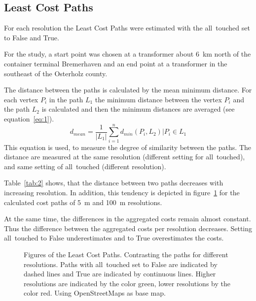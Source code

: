 \subsection{Least Cost Paths}\label{subsec:least-cost-paths}
For each resolution the Least Cost Paths were estimated with the all~touched set to False and True.

For the study, a start point was chosen at a transformer about 6~km north of the container terminal Bremerhaven and an end point at a transformer in the southeast of the Osterholz county. 

The distance between the paths is calculated by the mean minimum distance.
For each vertex $P_i$ in the path $L_1$ the minimum distance between the vertex $P_i$ and the path $L_2$
is calculated and then the minimum distances are averaged (see equation~\ref{eq:1}).
\begin{equation}
	\label{eq:1}
	d_{mean} = \frac{1}{|L_1|} \sum_{i=1}^{n} d_{min}(P_i, L_2) \Bigr\vert P_i \in L_1
\end{equation}
This equation is used, to measure the degree of similarity between the paths.
The distance are measured at the same resolution (different setting for all~touched), and same setting of all~touched (different resolution).

Table~\ref{tab:2} shows, that the distance between two paths decreases
with increasing resolution.
In addition, this tendency is depicted in figure~\ref{fig:paths_resolution} for the calculated cost paths of 5~m and 100~m resolutions.


At the same time, the differences in the aggregated costs remain almost constant.
Thus the difference between the aggregated costs per resolution decreases.
Setting all~touched to False underestimates and to True overestimates the costs.

\begin{figure}
	\centering

	\qquad
	\caption{Figures of the Least Cost Paths. Contrasting the paths for different resolutions. Paths with all~touched set to False are indicated by dashed lines and True are indicated by continuous lines. Higher resolutions are indicated by the color green, lower resolutions by the color red. Using OpenStreetMaps as base map.}
	\label{fig:paths_resolution}
\end{figure}

